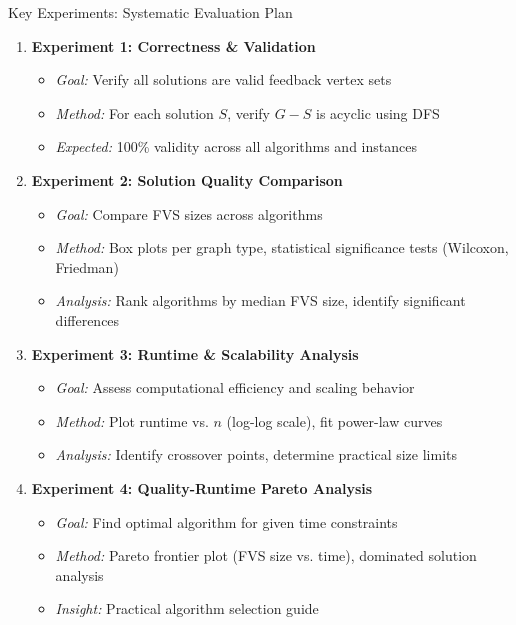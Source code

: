 \documentclass[aspectratio=169]{beamer}
\begin{document}
\begin{frame}{Key Experiments: Systematic Evaluation Plan}
	\begin{enumerate}
		\item \textbf{Experiment 1: Correctness \& Validation}
		      \begin{itemize}
			      \scriptsize
			      \item \textit{Goal:} Verify all solutions are valid feedback vertex sets
			      \item \textit{Method:} For each solution $S$, verify $G - S$ is acyclic using DFS
			      \item \textit{Expected:} 100\% validity across all algorithms and instances
		      \end{itemize}

		      \vspace{0.15cm}
		\item \textbf{Experiment 2: Solution Quality Comparison}
		      \begin{itemize}
			      \scriptsize
			      \item \textit{Goal:} Compare FVS sizes across algorithms
			      \item \textit{Method:} Box plots per graph type, statistical significance tests (Wilcoxon, Friedman)
			      \item \textit{Analysis:} Rank algorithms by median FVS size, identify significant differences
		      \end{itemize}

		      \vspace{0.15cm}
		\item \textbf{Experiment 3: Runtime \& Scalability Analysis}
		      \begin{itemize}
			      \scriptsize
			      \item \textit{Goal:} Assess computational efficiency and scaling behavior
			      \item \textit{Method:} Plot runtime vs. $n$ (log-log scale), fit power-law curves
			      \item \textit{Analysis:} Identify crossover points, determine practical size limits
		      \end{itemize}

		      \vspace{0.15cm}
		\item \textbf{Experiment 4: Quality-Runtime Pareto Analysis}
		      \begin{itemize}
			      \scriptsize
			      \item \textit{Goal:} Find optimal algorithm for given time constraints
			      \item \textit{Method:} Pareto frontier plot (FVS size vs. time), dominated solution analysis
			      \item \textit{Insight:} Practical algorithm selection guide
		      \end{itemize}
	\end{enumerate}
\end{frame}
\end{document}
